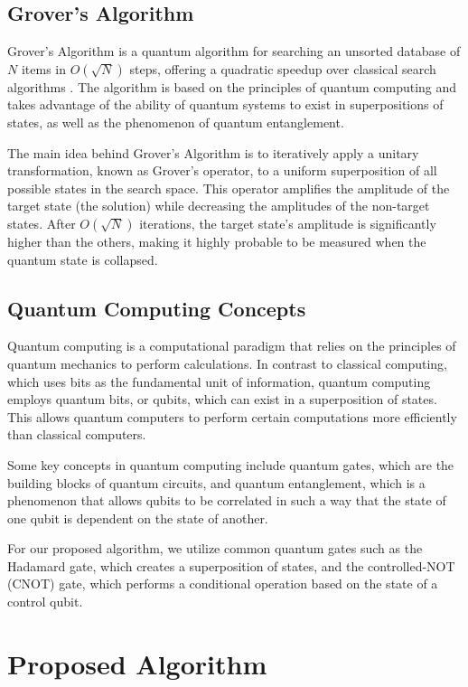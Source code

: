 \subsection{Grover's Algorithm}

Grover's Algorithm is a quantum algorithm for searching an unsorted database of $N$ items in $O(\sqrt{N})$ steps, offering a quadratic speedup over classical search algorithms \cite{grover1996fast}. The algorithm is based on the principles of quantum computing and takes advantage of the ability of quantum systems to exist in superpositions of states, as well as the phenomenon of quantum entanglement.

The main idea behind Grover's Algorithm is to iteratively apply a unitary transformation, known as Grover's operator, to a uniform superposition of all possible states in the search space. This operator amplifies the amplitude of the target state (the solution) while decreasing the amplitudes of the non-target states. After $O(\sqrt{N})$ iterations, the target state's amplitude is significantly higher than the others, making it highly probable to be measured when the quantum state is collapsed.

\subsection{Quantum Computing Concepts}

Quantum computing is a computational paradigm that relies on the principles of quantum mechanics to perform calculations. In contrast to classical computing, which uses bits as the fundamental unit of information, quantum computing employs quantum bits, or qubits, which can exist in a superposition of states. This allows quantum computers to perform certain computations more efficiently than classical computers.

Some key concepts in quantum computing include quantum gates, which are the building blocks of quantum circuits, and quantum entanglement, which is a phenomenon that allows qubits to be correlated in such a way that the state of one qubit is dependent on the state of another.

For our proposed algorithm, we utilize common quantum gates such as the Hadamard gate, which creates a superposition of states, and the controlled-NOT (CNOT) gate, which performs a conditional operation based on the state of a control qubit.

\section{Proposed Algorithm}\label{sec:algorithm}

